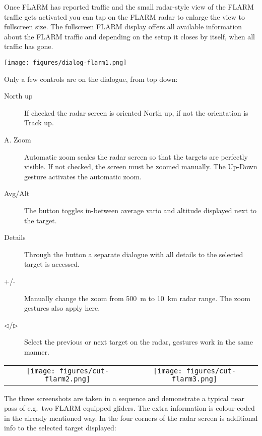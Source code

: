 Once FLARM has reported traffic and the small radar-style view of the FLARM
traffic gets activated   you can tap on the FLARM radar to
enlarge the view to fullscreen size.  
The fullscreen FLARM display offers all available information
about the FLARM traffic and depending on the setup it closes by itself, when all
traffic has gone.

\begin{center}
\texttt{[image: figures/dialog-flarm1.png]}
\end{center}

Only a few controls are on the dialogue, from top down:
\begin{description}
\item[North up]  If checked the radar screen is oriented North up, if not the
orientation is Track up.
\item[A. Zoom]   Automatic zoom scales the radar screen so
that the targets are perfectly visible. If not checked, the screen must be
zoomed manually. The Up-Down gesture activates the automatic zoom. 
\item[Avg/Alt]   The button toggles in-between average
vario and altitude displayed next to the target.
\item[Details]   Through the button a separate dialogue with
all details to the selected target is accessed. 
\item[+/-]   Manually change the zoom from 500~m to
10~km radar range. The zoom gestures also apply here.
\item[$\triangleleft$/$\triangleright$]   Select the
previous or next target on the radar, gestures work in the same manner.
\end{description}

\begin{center}
\begin{tabular}{c c}
\texttt{[image: figures/cut-flarm2.png]}&
\texttt{[image: figures/cut-flarm3.png]}\\
\end{tabular}
\end{center}
The three screenshots are taken in a sequence and demonstrate a typical near
pass of e.g.\ two FLARM equipped gliders. The extra information is colour-coded
in the already mentioned way. In the four corners of the radar screen is
additional info to the selected target displayed:

